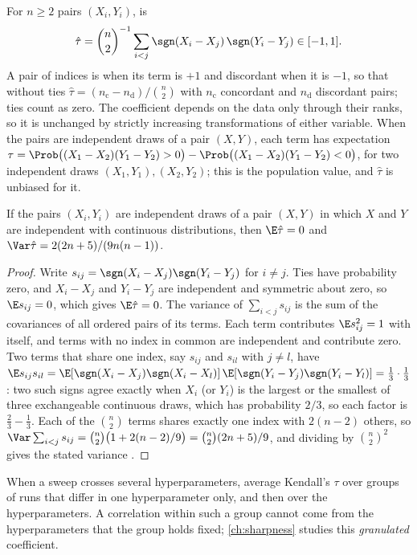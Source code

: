 \begin{refsection}
For $n\ge2$ pairs $(X_i,Y_i)$,  is
\[
\hat\tau=\binom n2^{-1}\sum_{i<j}\sgn(X_i-X_j)\,\sgn(Y_i-Y_j)\in[-1,1].
\]
A pair of indices is  when its term is $+1$ and discordant when it is $-1$, so that without ties $\hat\tau=(n_{\mathrm c}-n_{\mathrm d})/\binom n2$ with $n_{\mathrm c}$ concordant and $n_{\mathrm d}$ discordant pairs; ties count as zero. The coefficient depends on the data only through their ranks, so it is unchanged by strictly increasing transformations of either variable. When the pairs are independent draws of a pair $(X,Y)$, each term has expectation $\tau=\Prob\bigl((X_1-X_2)(Y_1-Y_2)>0\bigr)-\Prob\bigl((X_1-X_2)(Y_1-Y_2)<0\bigr)$, for two independent draws $(X_1,Y_1),(X_2,Y_2)$; this is the population value, and $\hat\tau$ is unbiased for it.

\begin{proposition}\label{thm:toolkit:kendall}
If the pairs $(X_i,Y_i)$ are independent draws of a pair $(X,Y)$ in which $X$ and $Y$ are independent with continuous distributions, then $\E\hat\tau=0$ and $\Var\hat\tau=2(2n+5)/(9n(n-1))$.
\end{proposition}

\begin{proof}
Write $s_{ij}=\sgn(X_i-X_j)\sgn(Y_i-Y_j)$ for $i\ne j$. Ties have probability zero, and $X_i-X_j$ and $Y_i-Y_j$ are independent and symmetric about zero, so $\E s_{ij}=0$, which gives $\E\hat\tau=0$. The variance of $\sum_{i<j}s_{ij}$ is the sum of the covariances of all ordered pairs of its terms. Each term contributes $\E s_{ij}^2=1$ with itself, and terms with no index in common are independent and contribute zero. Two terms that share one index, say $s_{ij}$ and $s_{il}$ with $j\ne l$, have $\E s_{ij}s_{il}=\E[\sgn(X_i-X_j)\sgn(X_i-X_l)]\,\E[\sgn(Y_i-Y_j)\sgn(Y_i-Y_l)]=\frac13\cdot\frac13$: two such signs agree exactly when $X_i$ (or $Y_i$) is the largest or the smallest of three exchangeable continuous draws, which has probability $2/3$, so each factor is $\frac23-\frac13$. Each of the $\binom n2$ terms shares exactly one index with $2(n-2)$ others, so $\Var\sum_{i<j}s_{ij}=\binom n2\bigl(1+2(n-2)/9\bigr)=\binom n2(2n+5)/9$, and dividing by $\binom n2^2$ gives the stated variance \parencite{Kendall1938,Kendall1970}.
\end{proof}

When a sweep crosses several hyperparameters, \textcite{JiangEtAl2020} average Kendall's $\tau$ over groups of runs that differ in one hyperparameter only, and then over the hyperparameters. A correlation within such a group cannot come from the hyperparameters that the group holds fixed; \cref{ch:sharpness} studies this \emph{granulated} coefficient.


\end{refsection}
